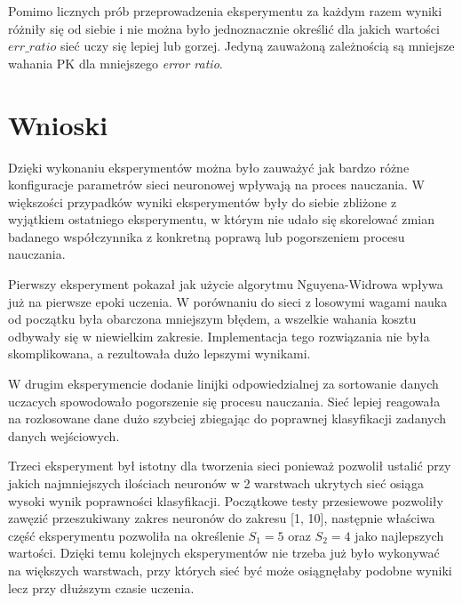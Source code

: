 \documentclass[a4paper,12pt]{article}
\numberwithin{equation}{section}
\begin{document}
Pomimo licznych prób przeprowadzenia eksperymentu za każdym razem wyniki różniły się od siebie i nie można było jednoznacznie określić dla jakich wartości $err\_ratio$ sieć uczy się lepiej lub gorzej. Jedyną zauważoną zależnością są mniejsze wahania PK dla mniejszego \textit{error ratio}.

    

\pagebreak

\section{Wnioski}

Dzięki wykonaniu eksperymentów można było zauważyć jak bardzo różne konfiguracje parametrów sieci neuronowej wpływają na proces nauczania. W większości przypadków wyniki eksperymentów były do siebie zbliżone z wyjątkiem ostatniego eksperymentu, w którym nie udało się skorelować zmian badanego współczynnika z konkretną poprawą lub pogorszeniem procesu nauczania. 

Pierwszy eksperyment pokazał jak użycie algorytmu Nguyena-Widrowa wpływa już na pierwsze epoki uczenia. W porównaniu do sieci z losowymi wagami nauka od początku była obarczona mniejszym błędem, a wszelkie wahania kosztu odbywały się w niewielkim zakresie. Implementacja tego rozwiązania nie była skomplikowana, a rezultowała dużo lepszymi wynikami.

W drugim eksperymencie dodanie linijki odpowiedzialnej za sortowanie danych uczacych spowodowało pogorszenie się procesu nauczania. Sieć lepiej reagowała na rozlosowane dane dużo szybciej zbiegając do poprawnej klasyfikacji zadanych danych wejściowych.

Trzeci eksperyment był istotny dla tworzenia sieci ponieważ pozwolił ustalić przy jakich najmniejszych ilościach neuronów w 2 warstwach ukrytych sieć osiąga wysoki wynik poprawności klasyfikacji. Początkowe testy przesiewowe pozwoliły zawęzić przeszukiwany zakres neuronów do zakresu [1, 10], następnie właściwa część eksperymentu pozwoliła na określenie $S_1=5$ oraz $S_2=4$ jako najlepszych wartości. Dzięki temu kolejnych eksperymentów nie trzeba już było wykonywać na większych warstwach, przy których sieć być może osiągnęłaby podobne wyniki lecz przy dłuższym czasie uczenia.
\end{document}
